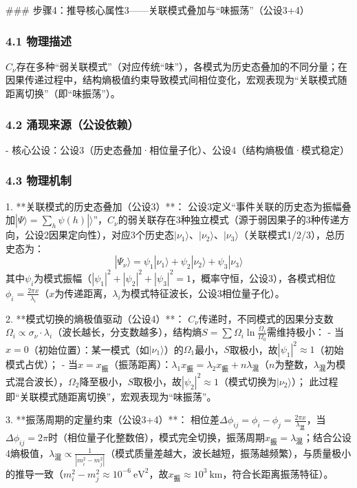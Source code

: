 \documentclass{article}
\begin{document}
### 步骤4：推导核心属性3——关联模式叠加与“味振荡”（公设3+4）
\subsubsection{4.1 物理描述}
\(C_{\nu}\)存在多种“弱关联模式”（对应传统“味”），各模式为历史态叠加的不同分量；在因果传递过程中，结构熵极值约束导致模式间相位变化，宏观表现为“关联模式随距离切换”（即“味振荡”）。

\subsubsection{4.2 涌现来源（公设依赖）}
- 核心公设：公设3（历史态叠加·相位量子化）、公设4（结构熵极值·模式稳定）

\subsubsection{4.3 物理机制}
1. **关联模式的历史态叠加（公设3）**：  
   公设3定义“事件关联的历史态为振幅叠加\(|\Psi\rangle = \sum_h \psi(h)|\rangle\)”，\(C_{\nu}\)的弱关联存在3种独立模式（源于弱因果子的3种传递方向，公设2因果定向性），对应3个历史态\(|\nu_1\rangle\)、\(|\nu_2\rangle\)、\(|\nu_3\rangle\)（关联模式1/2/3），总历史态为：  
   \[
   |\Psi_{\nu}\rangle = \psi_1|\nu_1\rangle + \psi_2|\nu_2\rangle + \psi_3|\nu_3\rangle
   \]
   其中\(\psi_i\)为模式振幅（\(|\psi_1|^2 + |\psi_2|^2 + |\psi_3|^2 = 1\)，概率守恒，公设3），各模式相位\(\phi_i = \frac{2\pi x}{\lambda_i}\)（\(x\)为传递距离，\(\lambda_i\)为模式特征波长，公设3相位量子化）。

2. **模式切换的熵极值驱动（公设4）**：  
   \(C_{\nu}\)传递时，不同模式的因果分支数\(\Omega_i \propto \sigma_{\nu} \cdot \lambda_i\)（波长越长，分支数越多），结构熵\(S = \sum \Omega_i \ln\frac{\Omega_i}{\Omega_0}\)需维持极小：  
   - 当\(x = 0\)（初始位置）：某一模式（如\(|\nu_1\rangle\)）的\(\Omega_1\)最小，\(S\)取极小，故\(|\psi_1|^2≈1\)（初始模式占优）；  
   - 当\(x = x_{\text{振}}\)（振荡距离）：\(\lambda_1 x_{\text{振}} = \lambda_2 x_{\text{振}} + n\lambda_{\text{混}}\)（\(n\)为整数，\(\lambda_{\text{混}}\)为模式混合波长），\(\Omega_2\)降至极小，\(S\)取极小，故\(|\psi_2|^2≈1\)（模式切换为\(|\nu_2\rangle\)）；  
   此过程即“关联模式随距离切换”，宏观表现为“味振荡”。

3. **振荡周期的定量约束（公设3+4）**：  
   相位差\(\Delta\phi_{ij} = \phi_i - \phi_j = \frac{2\pi x}{\lambda_{\text{混}}}\)，当\(\Delta\phi_{ij} = 2\pi\)时（相位量子化整数倍），模式完全切换，振荡周期\(x_{\text{振}} = \lambda_{\text{混}}\)；结合公设4熵极值，\(\lambda_{\text{混}} \propto \frac{1}{|m_i^2 - m_j^2|}\)（模式质量差越大，波长越短，振荡越频繁），与质量极小的推导一致（\(m_i^2 - m_j^2≈10^{-6}\ \text{eV}^2\)，故\(x_{\text{振}}≈10^3\ \text{km}\)，符合长距离振荡特征）。
\end{document}
